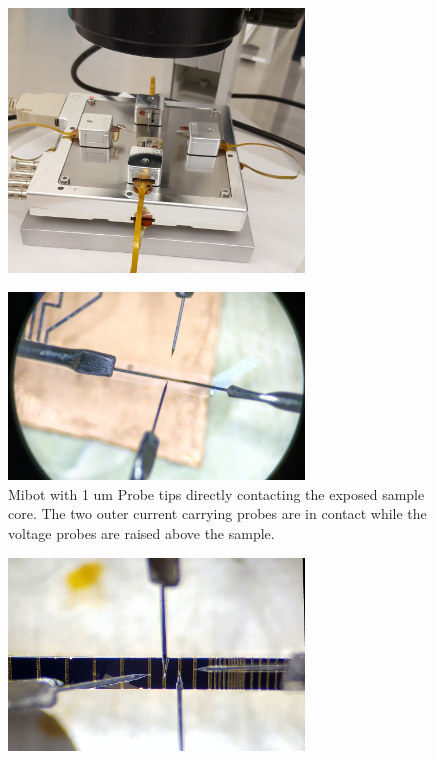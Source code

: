 \begin{figure}[t]
  \centering
    \includegraphics[width=0.7\textwidth]{fig/MiBots/setup.jpg}
 \caption{}
\label{mibot}
\end{figure}

\begin{figure}[t]
  \centering
    \includegraphics[width=0.7\textwidth]{fig/MiBots/IMG_20190409_143016.jpg}
 \caption{ Mibot with 1 um Probe tips directly contacting the exposed sample core. The two outer current carrying probes are in contact while the voltage probes are raised above the sample.}
\label{mibot}
\end{figure}

\begin{figure}[t]
  \centering
    \includegraphics[width=0.7\textwidth]{fig/MiBots/closeup.jpg}
 \caption{}
\label{mibot}
\end{figure}

\cleardoublepage